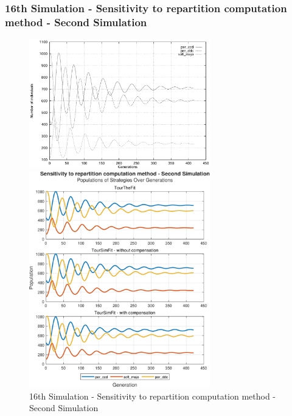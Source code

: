 \documentclass[12pt]{article}
\begin{document}
\subsubsection{16th Simulation - Sensitivity to repartition computation method - Second Simulation}
	\begin{figure}[h]
	    \centering
		\includegraphics[width=0.7\textwidth]{RefPaperFigures/fig12a.jpeg}\par\vspace{0.5em}
	    \includegraphics[width=0.7\textwidth]{Sensitivity to repartition computation method - Second Simulation.pdf}
	    \caption{16th Simulation - Sensitivity to repartition computation method - Second Simulation}
	    \label{fig:Monotonous Convergence}
	\end{figure}
\end{document}
